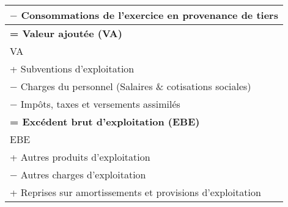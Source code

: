 \begin{table}[h]
\begin{tabular}{|l|}
  $-$ Consommations de l'exercice en provenance de tiers \\                                                                      
\hline                                                                                                          
  \textbf{= Valeur ajoutée (VA)} \\                                                                       
\hline                                                                                                          
  VA \\                                                                      
\hline                                                                                                          
  + Subventions d'exploitation \\                                                                      
\hline                                                                                                          
  $-$ Charges du personnel (Salaires \& cotisations sociales) \\                                                                      
\hline                                                                                                          
  $-$ Impôts, taxes et versements assimilés \\                                                                      
\hline                                                                                                          
  \textbf{= Excédent brut d'exploitation (EBE)} \\                                                                      
\hline                                                                                                          
  EBE \\                                                                      
\hline                                                                                                          
  + Autres produits d'exploitation \\                                                                      
\hline                                                                                                          
  $-$ Autres charges d'exploitation \\  
\hline                                                                                                          
  + Reprises sur amortissements et provisions d'exploitation \\                                                                      

\end{tabular}
\end{table}
